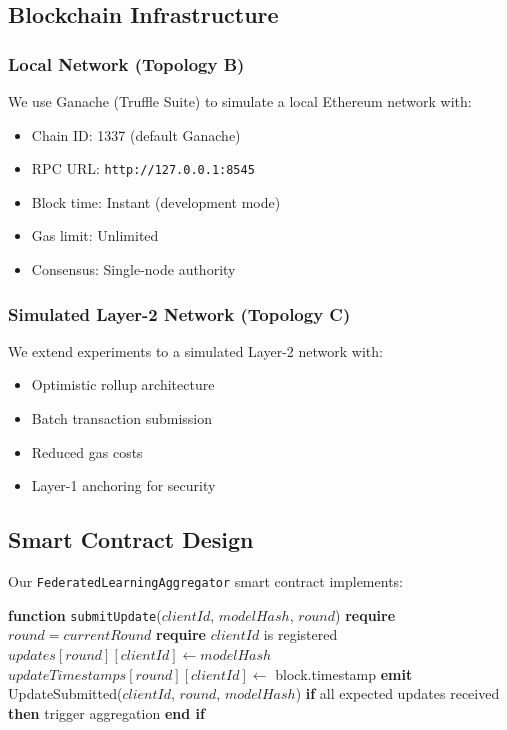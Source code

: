 \documentclass{ieeeaccess}
\begin{document}
\subsection{Blockchain Infrastructure}

\subsubsection{Local Network (Topology B)}

We use Ganache (Truffle Suite) to simulate a local Ethereum network with:
\begin{itemize}
    \item Chain ID: 1337 (default Ganache)
    \item RPC URL: \texttt{http://127.0.0.1:8545}
    \item Block time: Instant (development mode)
    \item Gas limit: Unlimited
    \item Consensus: Single-node authority
\end{itemize}

\subsubsection{Simulated Layer-2 Network (Topology C)}

We extend experiments to a simulated Layer-2 network with:
\begin{itemize}
    \item Optimistic rollup architecture
    \item Batch transaction submission
    \item Reduced gas costs
    \item Layer-1 anchoring for security
\end{itemize}

\subsection{Smart Contract Design}

Our \texttt{FederatedLearningAggregator} smart contract implements:

\begin{algorithm}[t]
\caption{Smart Contract Update Submission}
\label{alg:contract_update}
\begin{algorithmic}[1]
\STATE \textbf{function} \texttt{submitUpdate}($clientId$, $modelHash$, $round$)
\STATE \textbf{require} $round = currentRound$
\STATE \textbf{require} $clientId$ is registered
\STATE $updates[round][clientId] \gets modelHash$
\STATE $updateTimestamps[round][clientId] \gets$ block.timestamp
\STATE \textbf{emit} UpdateSubmitted($clientId$, $round$, $modelHash$)
\STATE \textbf{if} all expected updates received \textbf{then}
\STATE \quad trigger aggregation
\STATE \textbf{end if}
\end{algorithmic}
\end{algorithm}
\end{document}

